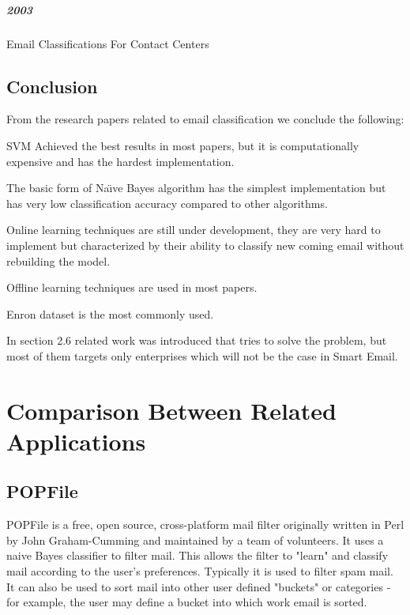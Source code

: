 \subparagraph{2003}
\begin{my_itemize}
  \item Email Classifications For Contact Centers \cite{ANI03}
\end{my_itemize}


\subsection{Conclusion}
From the research papers related to email classification we conclude the following:
\begin{my_itemize}
    \item SVM Achieved the best results in most papers, but it is computationally expensive and has the hardest implementation.
    \item The basic form of Na\"{\i}ve Bayes algorithm has the simplest implementation but has very low classification accuracy compared to other algorithms.
    \item Online learning techniques are still under development, they are very hard to implement but characterized by their
    ability to classify new coming email without rebuilding the model.
    \item Offline learning techniques are used in most papers.
    \item Enron dataset is the most commonly used.
\end{my_itemize}

In section 2.6 related work was introduced that tries to solve the problem, but most of them targets only enterprises which will not be the case in Smart Email.

\section{Comparison Between Related Applications}

\subsection{POPFile}
POPFile is a free, open source, cross-platform mail filter originally written in Perl by John Graham-Cumming and maintained by a team of volunteers. It uses a naive Bayes classifier to filter mail. This allows the filter to "learn" and classify mail according to the user's preferences. Typically it is used to filter spam mail. It can also be used to sort mail into other user defined "buckets" or categories - for example, the user may define a bucket into which work email is sorted.


